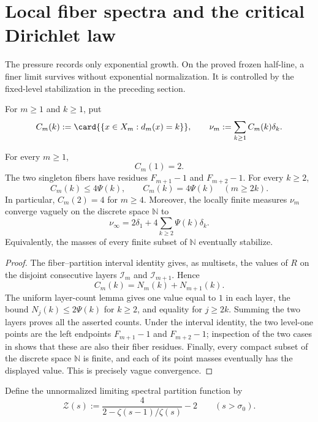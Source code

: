 \ifdefined\supplementonly
\else
\section{Local fiber spectra and the critical Dirichlet law}
\label{sec:local-spectrum}

The pressure records only exponential growth.  On the proved frozen
half-line, a finer limit survives without exponential normalization.  It is
controlled by the fixed-level stabilization in the preceding section.

For \(m\ge1\) and \(k\ge1\), put
\[
 C_m(k):=\card{\{x\in X_m:d_m(x)=k\}},
 \qquad
 \nu_m:=\sum_{k\ge1}C_m(k)\delta_k.
\]

\begin{theorem}
\label{thm:local-fiber-spectrum}
For every \(m\ge1\),
\[
 C_m(1)=2.
\]
The two singleton fibers have residues
\(F_{m+1}-1\) and \(F_{m+2}-1\).  For every \(k\ge2\),
\[
 C_m(k)\le4\Psi(k),
 \qquad
 C_m(k)=4\Psi(k)\quad(m\ge2k).
\]
In particular, \(C_m(2)=4\) for \(m\ge4\).  Moreover, the locally finite
measures \(\nu_m\) converge vaguely on the discrete space \(\mathbb N\) to
\[
 \nu_\infty=2\delta_1+4\sum_{k\ge2}\Psi(k)\delta_k.
\]
Equivalently, the masses of every finite subset of \(\mathbb N\) eventually
stabilize.
\end{theorem}

\begin{proof}
The fiber--partition interval identity gives, as multisets, the values of
\(R\) on the disjoint consecutive layers \(\mathcal I_m\) and
\(\mathcal I_{m+1}\).  Hence
\begin{equation}
 C_m(k)=N_m(k)+N_{m+1}(k).
 \label{eq:fiber-level-two-layer-count}
\end{equation}
The uniform layer-count lemma gives one value equal to \(1\) in each layer,
the bound \(N_j(k)\le2\Psi(k)\) for \(k\ge2\), and equality for
\(j\ge2k\).  Summing the two layers proves all the asserted counts.  Under
the interval identity, the two level-one points are the left endpoints
\(F_{m+1}-1\) and \(F_{m+2}-1\); inspection of the two cases in
 shows that these are also their fiber
residues.  Finally, every compact subset of the discrete space
\(\mathbb N\) is finite, and each of its point masses eventually has the
displayed value.  This is precisely vague convergence.
\end{proof}

Define the unnormalized limiting spectral partition function by
\[
 \mathcal Z(s):=\frac{4}{2-\zeta(s-1)/\zeta(s)}-2
 \qquad(s>\sigma_0).
\]


